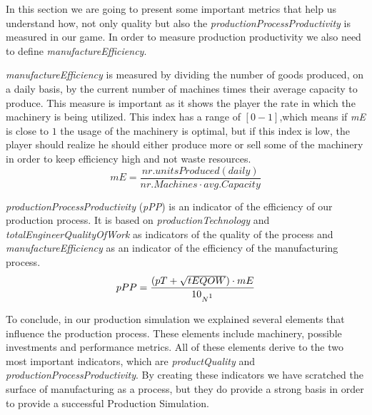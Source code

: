 In this section we are going to present some important metrics that help us understand how, not only quality but also the \textit{productionProcessProductivity} is measured in our game. In order to measure production productivity we also need to define  \textit{manufactureEfficiency}. 

\textit{manufactureEfficiency} is measured by dividing the number of goods produced, on a daily basis, by the current number of machines times their average capacity to produce. This measure is important as it shows the player the rate in which the machinery is being utilized. This index has a range of $[0-1]$,which means if \textit{mE} is close to $1$ the usage of the machinery is optimal, but if this index is low, the player should realize he should either produce more or sell some of the machinery in order to keep efficiency high and not waste resources.
\begin{equation}
mE= \frac{nr. units Produced(daily)}{nr. Machines\cdot avg. Capacity}  
\label{eq: ME}
\end{equation}

\textit{productionProcessProductivity} (\textit{pPP}) is an indicator of the efficiency of our production  process. It is based on \textit{productionTechnology} and \textit{totalEngineerQualityOfWork} as indicators of the quality of the process and \textit{manufactureEfficiency} as an indicator of the efficiency of the manufacturing process.
\begin{equation}
pPP= \frac{(pT + \sqrt{tEQOW}) \cdot mE}{10_{N\footnotemark}}
\label{eq:PPP}
\end{equation}
 
To conclude, in our production simulation we explained several elements that influence the production process. These elements include machinery, possible investments and performance metrics. All of these elements derive to the two most important indicators, which are \textit{productQuality} and \textit{productionProcessProductivity}. By creating these indicators we have scratched the surface of manufacturing as a process, but they do provide a strong basis in order to provide a successful Production Simulation. 